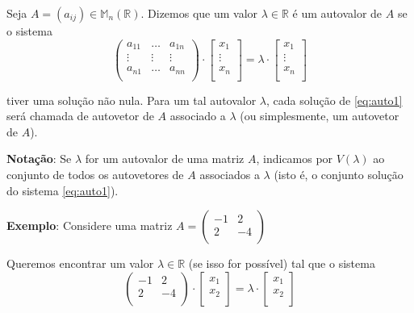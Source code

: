Seja $A=(a_{ij})\in\mathbb{M}_n(\mathbb{R})$. Dizemos que um valor $\lambda\in\mathbb{R}$ é um autovalor de $A$ se o sistema
\begin{equation} \label{eq:auto1}
\begin{pmatrix}a_{11} & \dots & a_{1n}\\ \vdots & \vdots & \vdots\\ a_{n1} & \dots & a_{nn}\\ \end{pmatrix}\cdot\begin{bmatrix}x_1\\ \vdots\\ x_n\\ \end{bmatrix}=\lambda\cdot\begin{bmatrix}x_1\\ \vdots\\ x_n\\ \end{bmatrix}
\end{equation}

tiver uma solução não nula. Para um tal autovalor $\lambda$, cada solução de \eqref{eq:auto1} será chamada de autovetor de $A$ associado a $\lambda$ (ou simplesmente, um autovetor de $A$).

\textbf{Notação}: Se $\lambda$ for um autovalor de uma matriz $A$, indicamos por $V(\lambda)$ ao conjunto de todos os autovetores de $A$ associados a $\lambda$ (isto é, o conjunto solução do sistema \eqref{eq:auto1}).

\textbf{Exemplo}: Considere uma matriz $A=\begin{pmatrix}-1 & 2\\ 2 & -4\\ \end{pmatrix}$

Queremos encontrar um valor $\lambda\in\mathbb{R}$ (se isso for possível) tal que o sistema
\begin{equation} \label{eq:autoex1}
\begin{pmatrix}-1 & 2\\ 2 & -4\\ \end{pmatrix}\cdot\begin{bmatrix}x_1\\x_2\\ \end{bmatrix}=\lambda\cdot\begin{bmatrix}x_1\\x_2\\ \end{bmatrix}
\end{equation}


